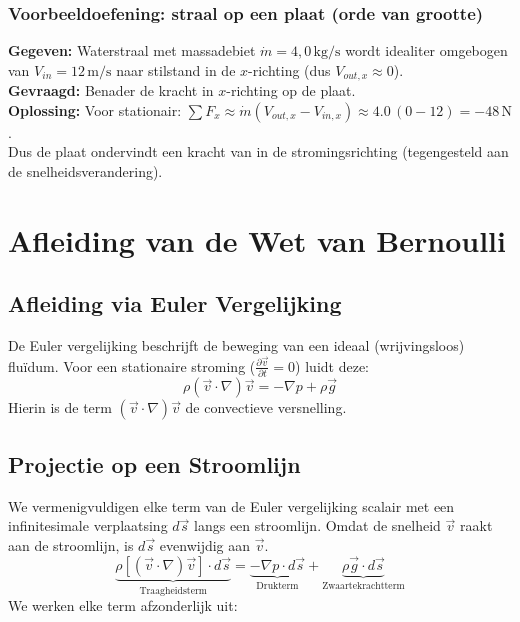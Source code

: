\documentclass[a4paper,11pt,twoside]{report}
\begin{document}
\subsubsection*{Voorbeeldoefening: straal op een plaat (orde van grootte)}
                	\textbf{Gegeven:} Waterstraal met massadebiet $\dot{m}=4{,}0\,\mathrm{kg/s}$ wordt idealiter omgebogen van $V_{in}=12\,\mathrm{m/s}$ naar stilstand in de $x$-richting (dus $V_{out,x}\approx 0$).\\
                	\textbf{Gevraagd:} Benader de kracht in $x$-richting op de plaat.\\
                	\textbf{Oplossing:}
Voor stationair: $\sum F_x\approx \dot{m}(V_{out,x}-V_{in,x})\approx 4.0\,(0-12)=-48\,\mathrm{N}$.\\
Dus de plaat ondervindt een kracht van  in de stromingsrichting (tegengesteld aan de snelheidsverandering).

\section{Afleiding van de Wet van Bernoulli}
\subsection{Afleiding via Euler Vergelijking}
De Euler vergelijking beschrijft de beweging van een ideaal (wrijvingsloos) fluïdum. Voor een stationaire stroming ($\frac{\partial \vec{v}}{\partial t} = 0$) luidt deze:
\[
\rho (\vec{v} \cdot \nabla)\vec{v} = -\nabla p + \rho \vec{g}
\]
Hierin is de term $(\vec{v} \cdot \nabla)\vec{v}$ de convectieve versnelling.

\subsection{Projectie op een Stroomlijn}
We vermenigvuldigen elke term van de Euler vergelijking scalair met een infinitesimale verplaatsing $d\vec{s}$ langs een stroomlijn. 
Omdat de snelheid $\vec{v}$ raakt aan de stroomlijn, is $d\vec{s}$ evenwijdig aan $\vec{v}$.
\[
\underbrace{\rho [(\vec{v} \cdot \nabla)\vec{v}] \cdot d\vec{s}}_{\text{Traagheidsterm}} = \underbrace{-\nabla p \cdot d\vec{s}}_{\text{Drukterm}} + \underbrace{\rho \vec{g} \cdot d\vec{s}}_{\text{Zwaartekrachtterm}}
\]
We werken elke term afzonderlijk uit:
\end{document}
